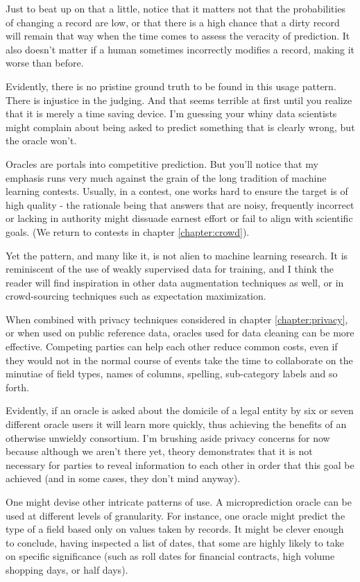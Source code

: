 Just to beat up on that a little, notice that it matters not that the probabilities of changing a record are low, or that there is a high chance that a dirty record will remain that way when the time comes to assess the veracity of prediction. It also doesn't matter if a human sometimes incorrectly modifies a record, making it worse than before. 

Evidently, there is no pristine ground truth to be found in this usage pattern. There is injustice in the judging. And that seems terrible at first until you realize that it is merely a time saving device. I'm guessing your whiny data scientists might complain about being asked to predict something that is clearly wrong, but the oracle won't.   

Oracles are portals into competitive prediction. But you'll notice that my emphasis runs very much against the grain of the long tradition of machine learning contests. Usually, in a contest, one works hard to ensure the target is of high quality - the rationale being that answers that are noisy, frequently incorrect or lacking in authority might dissuade earnest effort or fail to align with scientific goals. (We return to contests in chapter \ref{chapter:crowd}).

Yet the pattern, and many like it, is not alien to machine learning research. It is reminiscent of the use of weakly supervised data for training, and I think the reader will find inspiration in other data augmentation techniques as well, or in crowd-sourcing techniques such as expectation maximization.  

When combined with privacy techniques considered in chapter \ref{chapter:privacy}, or when used on public reference data, oracles used for data cleaning can be more effective. Competing parties can help each other reduce common costs, even if they would not in the normal course of events take the time to collaborate on the minutiae of field types, names of columns, spelling, sub-category labels and so forth.

Evidently, if an oracle is asked about the domicile of a legal entity by six or seven different oracle users it will learn more quickly, thus achieving the benefits of an otherwise unwieldy consortium. I'm brushing aside privacy concerns for now because although we aren't there yet, theory demonstrates that it is not necessary for parties to reveal information to each other in order that this goal be achieved (and in some cases, they don't mind anyway).  

One might devise other intricate patterns of use. A microprediction oracle can be used at different levels of granularity. For instance, one oracle might predict the type of a field based only on values taken by records. It might be clever enough to conclude, having inspected a list of dates, that some are highly likely to take on specific significance (such as roll dates for financial contracts, high volume shopping days, or half days). 

